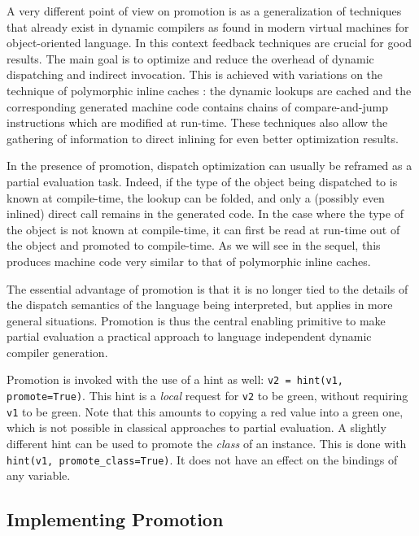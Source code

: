 A very different point of view on promotion is as a generalization of techniques
that already exist in dynamic compilers as found in modern virtual machines for
object-oriented language.  In this context feedback
techniques are crucial for good results.  The main goal is to
optimize and reduce the overhead of dynamic dispatching and indirect
invocation.  This is achieved with variations on the technique of
polymorphic inline caches \cite{hoelzle_optimizing_1991}: the dynamic lookups are cached and
the corresponding generated machine code contains chains of
compare-and-jump instructions which are modified at run-time.  These
techniques also allow the gathering of information to direct inlining for even
better optimization results. 

In the presence of promotion, dispatch optimization can usually be
reframed as a partial evaluation task.  Indeed, if the type of the
object being dispatched to is known at compile-time, the lookup can be
folded, and only a (possibly even inlined) direct call remains in the
generated code.  In the case where the type of the object is not known
at compile-time, it can first be read at run-time out of the object and
promoted to compile-time.  As we will see in the sequel, this produces
machine code very similar to that of polymorphic inline
caches.

The essential advantage of promotion is that it is no longer tied to the details of
the dispatch semantics of the language being interpreted, but applies in
more general situations.  Promotion is thus the central enabling
primitive to make partial evaluation a practical approach to language
independent dynamic compiler generation.

Promotion is invoked with the use of a hint as well:
\texttt{v2 = hint(v1, promote=True)}.
This hint is a \emph{local} request for \texttt{v2} to be green, without
requiring \texttt{v1} to be green.  Note that this amounts to copying
a red value into a green one, which is not possible in classical
approaches to partial evaluation. A slightly different hint can be used to
promote the \emph{class} of an instance. This is done with
\lstinline{hint(v1, promote_class=True)}. It does not have an effect on the
bindings of any variable.


\subsection{Implementing Promotion}

